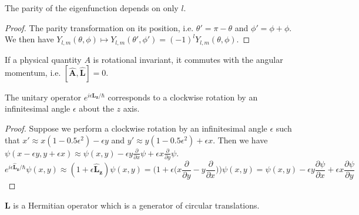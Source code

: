 \documentclass[a4paper]{article}
\begin{document}
\begin{cor}
The parity of the eigenfunction depends on only $l$.
\end{cor}
\begin{proof}
The parity transformation on its position, i.e. $\theta'=\pi-\theta$ and $\phi'=\phi+\phi$. We then have $Y_{l,m}(\theta,\phi)\mapsto Y_{l,m}(\theta',\phi')=(-1)^lY_{l,m}(\theta,\phi)$.
\end{proof}
\begin{defi}
If a physical quantity $A$ is rotational invariant, it commutes with the angular momentum, i.e. $[\mathbf{\hat{A}},\mathbf{\hat{L}}]=0$.
\end{defi}
\begin{thm}
The unitary operator $e^{i\epsilon\mathbf{\hat{L}_z}/\hbar}$ corresponds to a clockwise rotation by an infinitesimal angle $\epsilon$ about the $z$ axis.
\end{thm}
\begin{proof}
Suppose we perform a clockwise rotation by an infinitesimal angle $\epsilon$ such that $x'\approx x(1-0.5\epsilon^2)-\epsilon y$ and $y'\approx y(1-0.5\epsilon^2)+\epsilon x$. Then we have $\psi(x-\epsilon y,y+\epsilon x)\approx\psi(x,y)-\epsilon y\frac{\partial}{\partial x}\psi+\epsilon x\frac{\partial}{\partial y}\psi$. 
$$e^{i\epsilon\mathbf{\hat{L}_z}/\hbar}\psi(x,y)\approx(1+\epsilon\mathbf{\hat{L}_z})\psi(x,y)=\bigg(1+\epsilon\bigg(x\frac{\partial}{\partial y}-y\frac{\partial}{\partial x}\bigg)\bigg)\psi(x,y)=\psi(x,y)-\epsilon y\frac{\partial\psi}{\partial x}+\epsilon x\frac{\partial\psi}{\partial y}$$
\end{proof}
\begin{remarks}
$\mathbf{L}$ is a Hermitian operator which is a generator of circular translations.
\end{remarks}
\end{document}
